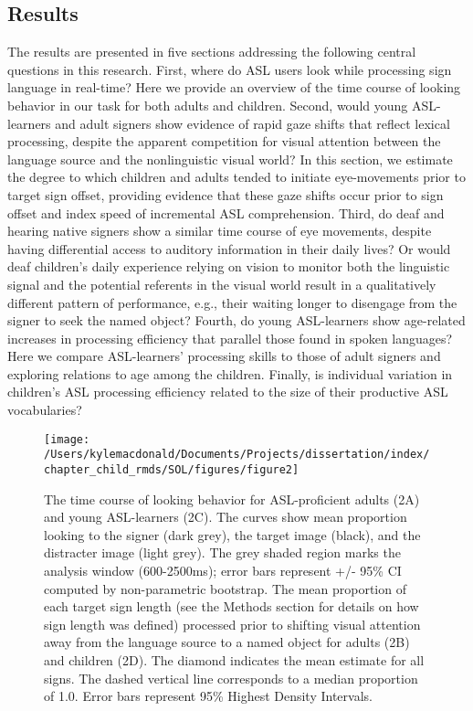 \documentclass[oneside]{report}
\begin{document}
\subsection{Results}\label{results}

The results are presented in five sections addressing the following
central questions in this research. First, where do ASL users look while
processing sign language in real-time? Here we provide an overview of
the time course of looking behavior in our task for both adults and
children. Second, would young ASL-learners and adult signers show
evidence of rapid gaze shifts that reflect lexical processing, despite
the apparent competition for visual attention between the language
source and the nonlinguistic visual world? In this section, we estimate
the degree to which children and adults tended to initiate eye-movements
prior to target sign offset, providing evidence that these gaze shifts
occur prior to sign offset and index speed of incremental ASL
comprehension. Third, do deaf and hearing native signers show a similar
time course of eye movements, despite having differential access to
auditory information in their daily lives? Or would deaf children's
daily experience relying on vision to monitor both the linguistic signal
and the potential referents in the visual world result in a
qualitatively different pattern of performance, e.g., their waiting
longer to disengage from the signer to seek the named object? Fourth, do
young ASL-learners show age-related increases in processing efficiency
that parallel those found in spoken languages? Here we compare
ASL-learners' processing skills to those of adult signers and exploring
relations to age among the children. Finally, is individual variation in
children's ASL processing efficiency related to the size of their
productive ASL vocabularies?
\begin{figure}[!t]

{\centering \texttt{[image: /Users/kylemacdonald/Documents/Projects/dissertation/index/chapter\_child\_rmds/SOL/figures/figure2]} 

}

\caption[Time course looking behavior for ASL-proficient adults and young ASL-learners]{The time course of looking behavior for ASL-proficient adults (2A) and young ASL-learners (2C). The curves show mean proportion looking to the signer (dark grey), the target image (black), and the distracter image (light grey). The grey shaded region marks the analysis window (600-2500ms); error bars represent +/- 95\% CI computed by non-parametric bootstrap. The mean proportion of each target sign length (see the Methods section for details on how sign length was defined) processed prior to shifting visual attention away from the language source to a named object for adults (2B) and children (2D). The diamond indicates the mean estimate for all signs. The dashed vertical line corresponds to a median proportion of 1.0. Error bars represent 95\% Highest Density Intervals.}\label{fig:sol-tc-figure}
\end{figure}
\end{document}
